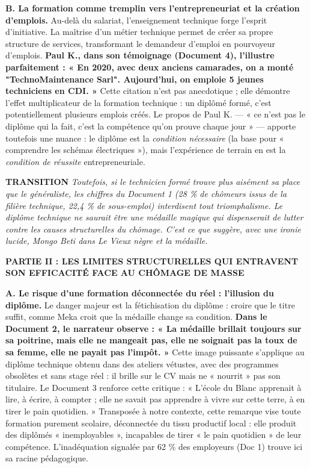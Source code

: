 \documentclass[11pt]{article}
\newcommand{\cle}[1]{{\popxbold\color{popdark}#1}}
\begin{document}
\begin{exoresolu}
\textbf{B. La formation comme tremplin vers l'entrepreneuriat et la création d'emplois.}
Au-delà du salariat, l'enseignement technique forge l'esprit d'initiative. La maîtrise d'un métier technique permet de créer sa propre structure de services, transformant le demandeur d'emploi en pourvoyeur d'emplois. \textbf{Paul K., dans son témoignage (Document 4), l'illustre parfaitement : « En 2020, avec deux anciens camarades, on a monté "TechnoMaintenance Sarl". Aujourd'hui, on emploie 5 jeunes techniciens en CDI. »} Cette citation n'est pas anecdotique ; elle démontre l'effet \cle{multiplicateur} de la formation technique : un diplômé formé, c'est potentiellement plusieurs emplois créés. Le propos de Paul K. — « ce n'est pas le diplôme qui la fait, c'est la compétence qu'on prouve chaque jour » — apporte toutefois une nuance : le diplôme est la \emph{condition nécessaire} (la base pour « comprendre les schémas électriques »), mais l'expérience de terrain en est la \emph{condition de réussite} entrepreneuriale.

\textbf{TRANSITION}
\emph{Toutefois, si le technicien formé trouve plus aisément sa place que le généraliste, les chiffres du Document 1 (28 \% de chômeurs issus de la filière technique, 22,4 \% de sous-emploi) interdisent tout triomphalisme. Le diplôme technique ne saurait être une médaille magique qui dispenserait de lutter contre les causes structurelles du chômage. C'est ce que suggère, avec une ironie lucide, Mongo Beti dans \emph{Le Vieux nègre et la médaille}.}

\textbf{PARTIE II : LES LIMITES STRUCTURELLES QUI ENTRAVENT SON EFFICACITÉ FACE AU CHÔMAGE DE MASSE}

\textbf{A. Le risque d'une formation déconnectée du réel : l'illusion du diplôme.}
Le danger majeur est la \cle{fétichisation du diplôme} : croire que le titre suffit, comme Meka croit que la médaille change sa condition. \textbf{Dans le Document 2, le narrateur observe : « La médaille brillait toujours sur sa poitrine, mais elle ne mangeait pas, elle ne soignait pas la toux de sa femme, elle ne payait pas l'impôt. »} Cette image puissante s'applique au diplôme technique obtenu dans des ateliers vétustes, avec des programmes obsolètes et sans stage réel : il brille sur le CV mais ne « nourrit » pas son titulaire. Le Document 3 renforce cette critique : « L'école du Blanc apprenait à lire, à écrire, à compter ; elle ne savait pas apprendre à vivre sur cette terre, à en tirer le pain quotidien. » Transposée à notre contexte, cette remarque vise toute formation purement scolaire, déconnectée du tissu productif local : elle produit des diplômés « inemployables », incapables de tirer « le pain quotidien » de leur compétence. L'inadéquation signalée par 62 \% des employeurs (Doc 1) trouve ici sa racine pédagogique.


\end{exoresolu}
\end{document}
